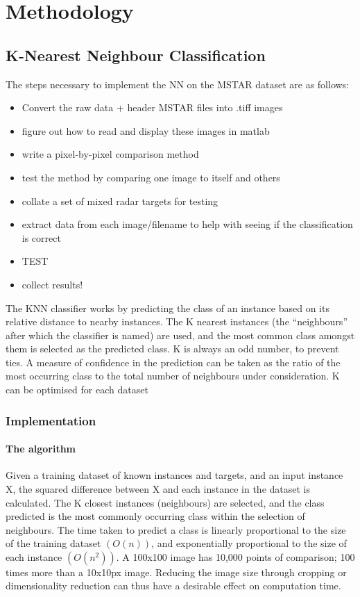 \chapter{Methodology}
\section{K-Nearest Neighbour Classification}
The steps necessary to implement the NN on the MSTAR dataset are as follows:\\

\begin{itemize}
\item Convert the raw data + header MSTAR files into .tiff images
\item figure out how to read and display these images in matlab
\item write a pixel-by-pixel comparison method
\item test the method by comparing one image to itself and others
\item collate a set of mixed radar targets for testing
\item extract data from each image/filename to help with seeing if the classification is correct
\item TEST
\item collect results!
\end{itemize}




The KNN classifier works by predicting the class of an instance based on its relative distance to nearby instances. The K nearest instances (the ``neighbours'' after which the classifier is named) are used, and the most common class amongst them is selected as the predicted class. K is always an odd number, to prevent ties. A measure of confidence in the prediction can be taken as the ratio of the most occurring class to the total number of neighbours under consideration. K can be optimised for each dataset

\subsection{Implementation}
\subsubsection{The algorithm}
Given a training dataset of known instances and targets, and an input instance X, the squared difference between X and each instance in the dataset is calculated. The K closest instances (neighbours) are selected, and the class predicted is the most commonly occurring class within the selection of neighbours. The time taken to predict a class is linearly proportional to the size of the training dataset $(O(n))$, and exponentially proportional to the size of each instance $(O(n^2))$. A 100x100 image has 10,000 points of comparison; 100 times more than a 10x10px image. Reducing the image size through cropping or dimensionality reduction can thus have a desirable effect on computation time.

